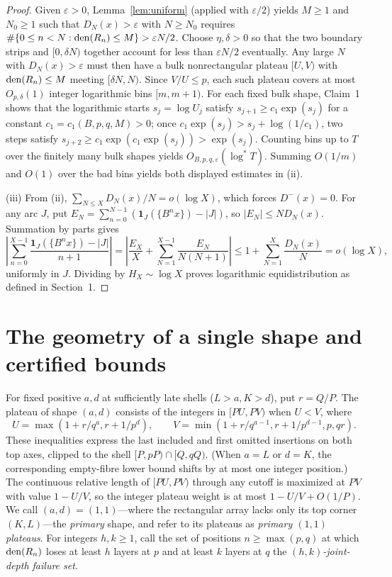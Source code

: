 \documentclass[11pt]{article}
\begin{document}
\begin{proof}
Given $\varepsilon>0$, Lemma~\ref{lem:uniform} (applied with $\varepsilon/2$) yields $M\ge1$ and $N_0\ge1$ such that $D_N(x)>\varepsilon$ with $N\ge N_0$ requires $\#\{0\le n<N:\operatorname{den}(R_n)\le M\}>\varepsilon N/2$. Choose $\eta,\delta>0$ so that the two boundary strips and $[0,\delta N)$ together account for less than $\varepsilon N/2$ eventually. Any large $N$ with $D_N(x)>\varepsilon$ must then have a bulk nonrectangular plateau $[U,V)$ with $\operatorname{den}(R_n)\le M$ meeting $[\delta N,N)$. Since $V/U\le p$, each such plateau covers at most $O_{p,\delta}(1)$ integer logarithmic bins $[m,m+1)$. For each fixed bulk shape, Claim~1 shows that the logarithmic starts $s_j=\log U_j$ satisfy $s_{j+1}\ge c_1\exp(s_j)$ for a constant $c_1=c_1(B,p,q,M)>0$; once $c_1\exp(s_j)>s_j+\log(1/c_1)$, two steps satisfy $s_{j+2}\ge c_1\exp(c_1\exp(s_j))>\exp(s_j)$. Counting bins up to $T$ over the finitely many bulk shapes yields $O_{B,p,q,\varepsilon}(\log^* T)$. Summing $O(1/m)$ and $O(1)$ over the bad bins yields both displayed estimates in (ii).

(iii) From (ii), $\sum_{N\le X}D_N(x)/N=o(\log X)$, which forces $D^-(x)=0$. For any arc $J$, put $E_N=\sum_{n=0}^{N-1}(\mathbf1_J(\{B^n x\})-|J|)$, so $|E_N|\le ND_N(x)$. Summation by parts gives
\[
 \left|\sum_{n=0}^{X-1}\frac{\mathbf1_J(\{B^n x\})-|J|}{n+1}\right|
 =\left|\frac{E_X}{X}+\sum_{N=1}^{X-1}\frac{E_N}{N(N+1)}\right|
 \le 1+\sum_{N=1}^{X}\frac{D_N(x)}{N}=o(\log X),
\]
uniformly in $J$. Dividing by $H_X\sim\log X$ proves logarithmic equidistribution as defined in Section~1.
\end{proof}

\section{The geometry of a single shape and certified bounds}\label{sec:shape}
For fixed positive $a,d$ at sufficiently late shells ($L>a,K>d$), put $r=Q/P$. The plateau of shape $(a,d)$ consists of the integers in $[PU,PV)$ when $U<V$, where
\[
 U=\max(1+r/q^a,r+1/p^d),\qquad
 V=\min(1+r/q^{a-1},r+1/p^{d-1},p,qr).
\]
These inequalities express the last included and first omitted insertions on both top axes, clipped to the shell $[P,pP)\cap[Q,qQ)$. (When $a=L$ or $d=K$, the corresponding empty-fibre lower bound shifts by at most one integer position.) The continuous relative length of $[PU,PV)$ through any cutoff is maximized at $PV$ with value $1-U/V$, so the integer plateau weight is at most $1-U/V+O(1/P)$. We call $(a,d)=(1,1)$---where the rectangular array lacks only its top corner $(K,L)$---the \emph{primary} shape, and refer to its plateaus as \emph{primary $(1,1)$ plateaus}. For integers $h,k\ge1$, call the set of positions $n\ge\max(p,q)$ at which $\operatorname{den}(R_n)$ loses at least $h$ layers at $p$ and at least $k$ layers at $q$ the \emph{$(h,k)$-joint-depth failure set}.
\end{document}

